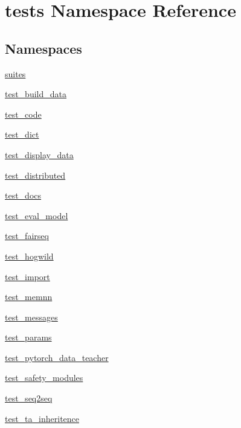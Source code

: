 \hypertarget{namespacetests}{}\section{tests Namespace Reference}
\label{namespacetests}
\subsection*{Namespaces}
\begin{DoxyCompactItemize}
\item 
 \hyperlink{namespacetests_1_1suites}{suites}
\item 
 \hyperlink{namespacetests_1_1test__build__data}{test\+\_\+build\+\_\+data}
\item 
 \hyperlink{namespacetests_1_1test__code}{test\+\_\+code}
\item 
 \hyperlink{namespacetests_1_1test__dict}{test\+\_\+dict}
\item 
 \hyperlink{namespacetests_1_1test__display__data}{test\+\_\+display\+\_\+data}
\item 
 \hyperlink{namespacetests_1_1test__distributed}{test\+\_\+distributed}
\item 
 \hyperlink{namespacetests_1_1test__docs}{test\+\_\+docs}
\item 
 \hyperlink{namespacetests_1_1test__eval__model}{test\+\_\+eval\+\_\+model}
\item 
 \hyperlink{namespacetests_1_1test__fairseq}{test\+\_\+fairseq}
\item 
 \hyperlink{namespacetests_1_1test__hogwild}{test\+\_\+hogwild}
\item 
 \hyperlink{namespacetests_1_1test__import}{test\+\_\+import}
\item 
 \hyperlink{namespacetests_1_1test__memnn}{test\+\_\+memnn}
\item 
 \hyperlink{namespacetests_1_1test__messages}{test\+\_\+messages}
\item 
 \hyperlink{namespacetests_1_1test__params}{test\+\_\+params}
\item 
 \hyperlink{namespacetests_1_1test__pytorch__data__teacher}{test\+\_\+pytorch\+\_\+data\+\_\+teacher}
\item 
 \hyperlink{namespacetests_1_1test__safety__modules}{test\+\_\+safety\+\_\+modules}
\item 
 \hyperlink{namespacetests_1_1test__seq2seq}{test\+\_\+seq2seq}
\item 
 \hyperlink{namespacetests_1_1test__ta__inheritence}{test\+\_\+ta\+\_\+inheritence}

\end{DoxyCompactItemize}
